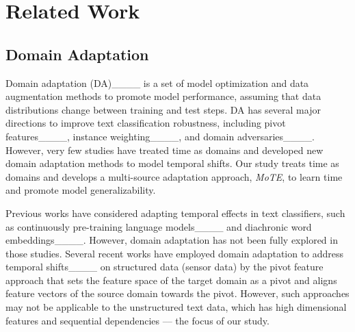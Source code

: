 \section{Related Work}


\subsection{Domain Adaptation}


Domain adaptation (DA)____ is a set of model optimization and data augmentation methods to promote model performance, assuming that data distributions change between training and test steps.
DA has several major directions to improve text classification robustness, including pivot features____, instance weighting____, and domain adversaries____. 
However, very few studies have treated time as domains and developed new domain adaptation methods to model temporal shifts.
Our study treats time as domains and develops a multi-source adaptation approach, \textit{MoTE}, to learn time and promote model generalizability.


Previous works have considered adapting temporal effects in text classifiers, such as continuously pre-training language models____ and diachronic word embeddings____. 
However, domain adaptation has not been fully explored in those studies.
Several recent works have employed domain adaptation to address temporal shifts____ on structured data (sensor data) by the pivot feature approach that sets the feature space of the target domain as a pivot and aligns feature vectors of the source domain towards the pivot.
However, such approaches may not be applicable to the unstructured text data, which has high dimensional features and sequential dependencies –– the focus of our study.

